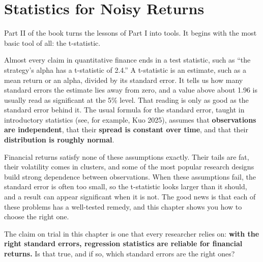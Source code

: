 \makeatletter
{}
\makeatother

\chapter{Statistics for Noisy Returns}
\label{ch:03}

Part II of the book turns the lessons of Part I into tools. It begins with the most basic tool of all: the t-statistic.

Almost every claim in quantitative finance ends in a test statistic, such as ``the strategy's alpha has a t-statistic of 2.4.'' A t-statistic is an estimate, such as a mean return or an alpha, divided by its standard error. It tells us how many standard errors the estimate lies away from zero, and a value above about 1.96 is usually read as significant at the 5\% level. 
That reading is only as good as the standard error behind it. The usual formula for the standard error, taught in introductory statistics (see, for example, Kuo 2025), assumes that \textbf{observations are independent}, that their \textbf{spread is constant over time}, and that their \textbf{distribution is roughly normal}.


Financial returns satisfy none of these assumptions exactly. Their tails are fat, their volatility comes in clusters, and some of the most popular research designs build strong dependence between observations. When these assumptions fail, the standard error is often too small, so the t-statistic looks larger than it should, and a result can appear significant when it is not. The good news is that each of these problems has a well-tested remedy, and this chapter shows you how to choose the right one.

The claim on trial in this chapter is one that every researcher relies on: \textbf{with the right standard errors, regression statistics are reliable for financial returns.} Is that true, and if so, which standard errors are the right ones?

